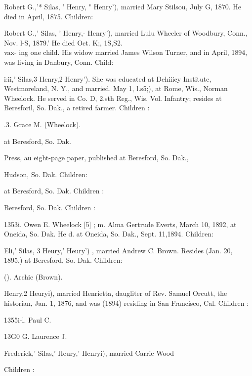 \documentclass[oneside]{book}
\begin{document}
Robert G.,'* Silas, ' Henry, " Henry'), married Mary Stilsou, July 
G, 1870. He died in April, 1875. Children: 


Robert G.,' Silas, ' Henry,- Henry'), married Lulu Wheeler of 
Woodbury, Conn., Nov. l-S, 1879.' He died Oct. K;, 1S,S2. \\vax- 
ing one child. His widow married James Wilson Turner, and in 
April, 1894, was living in Danbury, Conn. Child: 


i:ii,' Silas,3 Henry,2 Henry'). She was educated at Dehiiicy 
Institute, Westmoreland, N. Y., and married. May 1, l.s5;), at 
Rome, Wis., Norman Wheelock. He served in Co. D, 2.sth 
Reg., Wis. Vol. Infantry; resides at Beresforil, So. Dak., a 
retired farmer. Children : 




.3. Grace M. (Wheelock). 


at Beresford, So. Dak. 



Press, au eight-page paper, published at Beresford, So. Dak., 



Hudson, So. Dak. Children: 




at Beresford, So. Dak. Children : 






Beresford, So. Dak. Children : 

1353i. Owen E. Wheelock [5] ; m. Alma Gertrude Everts, March 10, 
1892, at Oneida, So. Dak. He d. at Oneida, So. Dak., Sept. 
11,1894. Children: 



Eli,' Silas, 3 Heury,' Heury') , married Andrew C. Brown. Resides 
(Jan. 20, 1895,) at Beresford, So. Dak. Children: 





(). Archie (Brown). 

Henry,2 Heuryi), married Henrietta, daugliter of Rev. Samuel 
Orcutt, the historian, Jan. 1, 1876, and was (1894) residing in 
San Francisco, Cal. Children : 

1355i-l. Paul C. 





13G0 G. Laurence J. 

Frederick,' Silas,' Heury,' Henryi), married Carrie Wood 

Children : 
\end{document}
